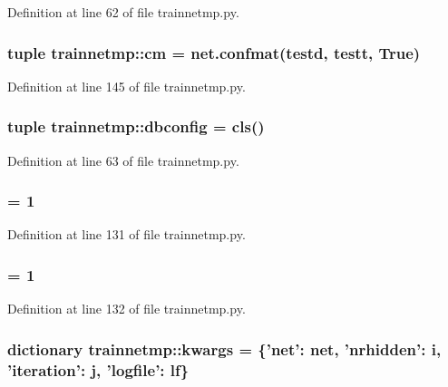 Definition at line 62 of file trainnetmp.py.

\hypertarget{namespacetrainnetmp_af36e6597c6ab86263c1f5da739583e3f}{
\subsubsection[{cm}]{\setlength{\rightskip}{0pt plus 5cm}tuple {\bf trainnetmp::cm} = net.confmat(testd, testt, True)}}
\label{namespacetrainnetmp_af36e6597c6ab86263c1f5da739583e3f}


Definition at line 145 of file trainnetmp.py.

\hypertarget{namespacetrainnetmp_a5b13bd831f315c6820696cabf93a0d85}{
\subsubsection[{dbconfig}]{\setlength{\rightskip}{0pt plus 5cm}tuple {\bf trainnetmp::dbconfig} = {\bf cls}()}}
\label{namespacetrainnetmp_a5b13bd831f315c6820696cabf93a0d85}


Definition at line 63 of file trainnetmp.py.

\hypertarget{namespacetrainnetmp_aa4405feef7b967d4eb9749579d3b1dad}{
\subsubsection[{jmax}]{ = 1}}
\label{namespacetrainnetmp_aa4405feef7b967d4eb9749579d3b1dad}


Definition at line 131 of file trainnetmp.py.

\hypertarget{namespacetrainnetmp_a8c5a189bb47054d719066421ae589642}{
\subsubsection[{kmax}]{ = 1}}
\label{namespacetrainnetmp_a8c5a189bb47054d719066421ae589642}


Definition at line 132 of file trainnetmp.py.

\hypertarget{namespacetrainnetmp_afecb97f9f28c04c9cce1e3342010cd53}{
\subsubsection[{kwargs}]{\setlength{\rightskip}{0pt plus 5cm}dictionary {\bf trainnetmp::kwargs} = \{'{\bf net}': {\bf net}, 'nrhidden': i, 'iteration': j, 'logfile': {\bf lf}\}}}
\label{namespacetrainnetmp_afecb97f9f28c04c9cce1e3342010cd53}


